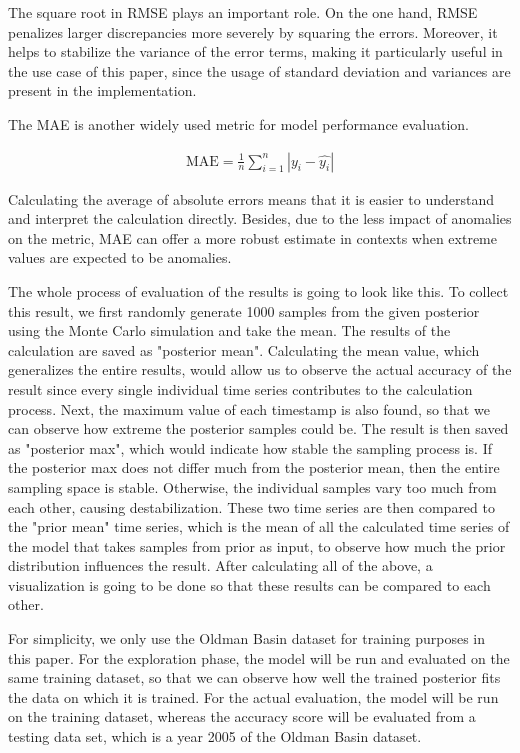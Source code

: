 The square root in RMSE plays an important role. On the one hand, RMSE penalizes larger discrepancies more severely by squaring the errors.\cite{RMSE_discrepency_penalty} Moreover, it helps to stabilize the variance of the error terms, making it particularly useful in the use case of this paper, since the usage of standard deviation and variances are present in the implementation.\cite{RMSE_MAE}

The MAE is another widely used metric for model performance evaluation.\cite{RMSE_MAE} 

\begin{align}
\text{MAE} = \frac 1 n \sum_{i=1}^n |y_i - \hat{y_i}|
\end{align}

Calculating the average of absolute errors means that it is easier to understand and interpret the calculation directly. Besides, due to the less impact of anomalies on the metric,\cite{RMSE_MAE} MAE can offer a more robust estimate in contexts when extreme values are expected to be anomalies.

The whole process of evaluation of the results is going to look like this. 
To collect this result, we first randomly generate 1000 samples from the given posterior using the Monte Carlo simulation \cite{monte_carlo_simulation} and take the mean. The results of the calculation are saved as "posterior mean". Calculating the mean value, which generalizes the entire results, would allow us to observe the actual accuracy of the result since every single individual time series contributes to the calculation process. Next, the maximum value of each timestamp is also found, so that we can observe how extreme the posterior samples could be. The result is then saved as "posterior max", which would indicate how stable the sampling process is. If the posterior max does not differ much from the posterior mean, then the entire sampling space is stable. Otherwise, the individual samples vary too much from each other, causing destabilization. These two time series are then compared to the "prior mean" time series, which is the mean of all the calculated time series of the model that takes samples from prior as input, to observe how much the prior distribution influences the result. After calculating all of the above, a visualization is going to be done so that these results can be compared to each other. 

For simplicity, we only use the Oldman Basin dataset for training purposes in this paper. For the exploration phase, the model will be run and evaluated on the same training dataset, so that we can observe how well the trained posterior fits the data on which it is trained. For the actual evaluation, the model will be run on the training dataset, whereas the accuracy score will be evaluated from a testing data set, which is a year 2005 of the Oldman Basin dataset.

